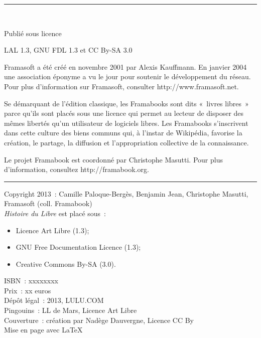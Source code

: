 \documentclass{FramateX}
\begin{document}
\begin{titlepage}
\begin{center}
\end{center}
\begin{center}
\noindent\rule{\linewidth/2}{1pt} \\
\end{center}
\begin{center}Publié sous licence\end{center}
\begin{center}LAL 1.3, GNU FDL 1.3 et CC By-SA 3.0\end{center}
\newpage 
\begin{flushleft}Framasoft a été créé en novembre 2001 par Alexis Kauffmann. En janvier 2004 une association éponyme a vu le jour pour soutenir le développement du réseau. Pour plus d'information sur Framasoft, consulter http://www.framasoft.net.\end{flushleft}
\begin{flushleft}Se démarquant de l'édition classique, les Framabooks sont dits «~livres libres~» parce qu'ils sont placés sous une licence qui permet au lecteur de disposer des mêmes libertés qu'un utilisateur de logiciels libres. Les Framabooks s'inscrivent dans cette culture des biens communs qui, à l'instar de Wikipédia, favorise la création, le partage, la diffusion et l'appropriation collective de la connaissance.\end{flushleft}
\begin{flushleft}Le projet Framabook est coordonné par Christophe Masutti. Pour plus d'information, consultez http://framabook.org.\end{flushleft}
\begin{center}\rule{100mm}{1pt}\end{center}\bigskip{}

\bigskip

\begin{small}
\noindent Copyright 2013~: Camille Paloque-Bergès, Benjamin Jean, Christophe Masutti, Framasoft (coll. Framabook)\\
\textit{Histoire du Libre} est placé sous~:
\begin{itemize}
\item     Licence Art Libre (1.3);
  \item     GNU Free Documentation Licence (1.3);
  \item     Creative Commons By-SA (3.0).
  \end{itemize}

\noindent ISBN~: xxxxxxxx \\
Prix~: xx euros \\
Dépôt légal~: 2013, LULU.COM \\
Pingouins~: LL de Mars, Licence Art Libre \\
Couverture~: création par Nadège Dauvergne, Licence CC By \\
Mise en page avec \LaTeX  \\
\end{small}



\end{titlepage}
\end{document}
